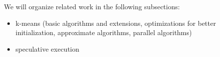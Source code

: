 We will organize related work in the following subsections:
\begin{itemize}
    \item k-means (basic algorithms and extensions, optimizations for better initialization, approximate algorithms, parallel algorithms)
    \item speculative execution
\end{itemize}